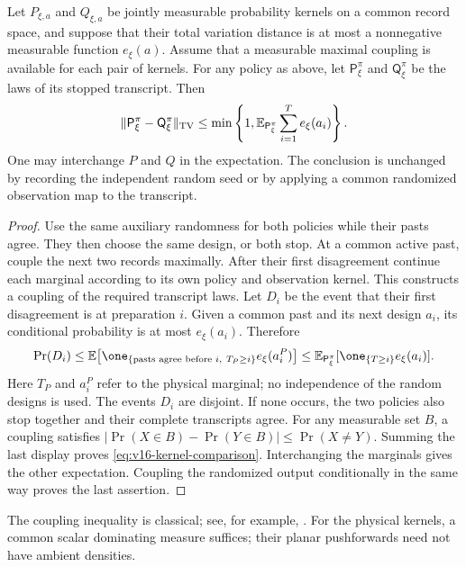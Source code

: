 \begin{lemma}
\label{lem:v16-kernel-comparison}
Let $P_{\xi,a}$ and $Q_{\xi,a}$ be jointly measurable probability
kernels on a common record space, and suppose that their total variation
distance is at most a nonnegative measurable function $e_\xi(a)$.
Assume that a measurable maximal coupling is available for each pair of
kernels. For any policy as above, let $\mathsf P_\xi^\pi$ and
$\mathsf Q_\xi^\pi$ be the laws of its stopped transcript. Then
\begin{equation}\label{eq:v16-kernel-comparison}
 \|\mathsf P_\xi^\pi-\mathsf Q_\xi^\pi\|_{\rm TV}
 \le \min\left\{1,
       \mathbb E_{\mathsf P_\xi^\pi}
          \sum_{i=1}^{T}e_\xi(a_i)\right\}.
\end{equation}
One may interchange $P$ and $Q$ in the expectation. The conclusion is
unchanged by recording the independent random seed or by applying a
common randomized observation map to the transcript.
\end{lemma}
\begin{proof}
Use the same auxiliary randomness for both policies while their pasts
agree. They then choose the same design, or both stop. At a common active
past, couple the next two records maximally. After their first disagreement
continue each marginal according to its own policy and observation
kernel. This constructs a coupling of the required transcript laws.
Let $D_i$ be the event that their first disagreement is at preparation
$i$. Given a common past and its next design $a_i$, its conditional
probability is at most $e_\xi(a_i)$. Therefore
\[
 \Pr(D_i)\le
 \mathbb E\bigl[\one_{\{\text{pasts agree before }i,\ T_P\ge i\}}
                         e_\xi(a_i^P)\bigr]
 \le \mathbb E_{\mathsf P_\xi^\pi}
                 [\one_{\{T\ge i\}}e_\xi(a_i)].
\]
Here $T_P$ and $a_i^P$ refer to the physical marginal; no independence
of the random designs is used. The events $D_i$ are disjoint. If none
occurs, the two policies also stop together and their complete transcripts
agree. For any measurable set $B$, a coupling satisfies
$|\Pr(X\in B)-\Pr(Y\in B)|\le\Pr(X\ne Y)$.
Summing the last display proves \eqref{eq:v16-kernel-comparison}.
Interchanging the marginals gives the other expectation. Coupling the
randomized output conditionally in the same way proves the last assertion.
\end{proof}

The coupling inequality is classical; see, for example,
\cite[Proposition 4.7]{LPW}. For the physical kernels, a common scalar dominating measure suffices;
their planar pushforwards need not have ambient densities.

